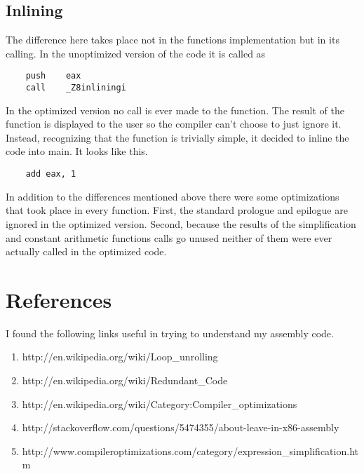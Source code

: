 \documentclass{article}
\begin{document}
\subsection{Inlining}
The difference here takes place not in the functions implementation but in its calling. In the unoptimized version of the code it is called as
\begin{lstlisting}
	push	eax
	call	_Z8inliningi
\end{lstlisting}
In the optimized version no call is ever made to the function. The result of the function is displayed to the user so the compiler can't choose to just ignore it. Instead, recognizing that the function is trivially simple, it decided to inline the code into main. It looks like this.
\begin{lstlisting}
	add	eax, 1
\end{lstlisting}

In addition to the differences mentioned above there were some optimizations that took place in every function. First, the standard prologue and epilogue are ignored in the optimized version. Second, because the results of the simplification and constant arithmetic functions calls go unused neither of them were ever actually called in the optimized code. 

\section*{References}
I found the following links useful in trying to understand my assembly code.
\begin{enumerate}
    \item http://en.wikipedia.org/wiki/Loop\_unrolling
    \item http://en.wikipedia.org/wiki/Redundant\_Code
    \item http://en.wikipedia.org/wiki/Category:Compiler\_optimizations
    \item http://stackoverflow.com/questions/5474355/about-leave-in-x86-assembly
    \item http://www.compileroptimizations.com/category/expression\_simplification.htm
\end{enumerate}
\end{document}
